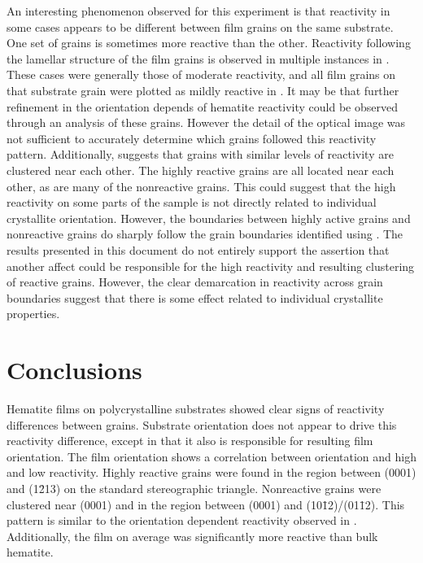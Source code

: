 An interesting phenomenon observed for this experiment is that reactivity in some cases
appears to be different between film grains on the same substrate. One set of grains is
sometimes more reactive than the other. Reactivity following the lamellar structure of the
film grains is observed in multiple instances in . These cases were
generally those of moderate reactivity, and all film grains on that substrate grain were
plotted as mildly reactive in . It may be that further refinement in
the orientation depends of hematite reactivity could be observed through an analysis of
these grains. However the detail of the optical image was not sufficient to accurately
determine which grains followed this reactivity pattern. Additionally,
 suggests that grains with similar levels of
reactivity are clustered near each other. The highly reactive grains are all located near
each other, as are many of the nonreactive grains. This could suggest that the high
reactivity on some parts of the sample is not directly related to individual crystallite
orientation. However, the boundaries between highly active grains and nonreactive grains
do sharply follow the grain boundaries identified using . The results presented
in this document do not entirely support the assertion that another affect could be 
responsible for the high reactivity and resulting clustering of reactive grains. However, 
the clear demarcation in reactivity across grain boundaries suggest that there is some 
effect related to individual crystallite properties.
 



\section{Conclusions}
\label{sec:poly.reac.conclusions}

Hematite films on polycrystalline substrates showed clear signs of reactivity differences
between grains. Substrate orientation does not appear to drive this reactivity difference,
except in that it also is responsible for resulting film orientation. The film orientation
shows a correlation between orientation and high and low reactivity. Highly reactive
grains were found in the region between (0001) and (1\={2}13) on the standard
stereographic triangle. Nonreactive grains were clustered near (0001) and in the region
between (0001) and (10\={1}2)/(01\={1}2). This pattern is similar to the orientation
dependent reactivity observed in . Additionally, the film on
average was significantly more reactive than bulk hematite. 
